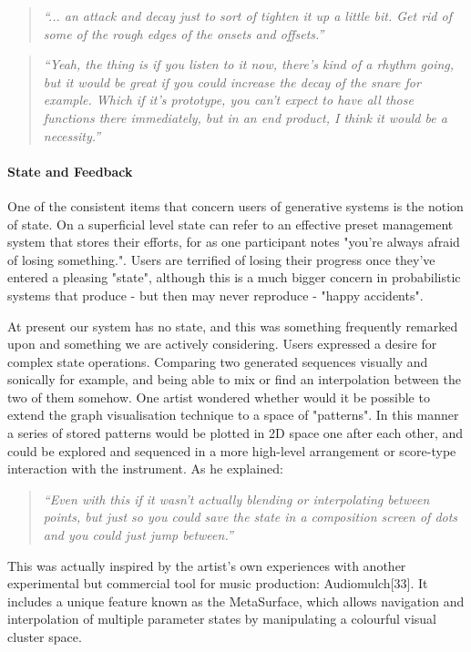 \blockquote{\textit{“... an attack and decay just to sort of tighten it up a little bit. Get rid of some of the rough edges of the onsets and offsets.”}}

\blockquote{\textit{“Yeah, the thing is if you listen to it now, there's kind of a rhythm going, but it would be great if you could increase the decay of the snare for example. Which if it's prototype, you can't expect to have all those functions there immediately, but in an end product, I think it would be a necessity.”}}

\paragraph{State and Feedback}

One of the consistent items that concern users of generative systems is the notion of state. On a superficial level state can refer to an effective preset management system that stores their efforts, for as one participant notes "you're always afraid of losing something.". Users are terrified of losing their progress once they've entered a pleasing "state", although this is a much bigger concern in probabilistic systems that produce - but then may never reproduce - "happy accidents".

At present our system has no state, and this was something frequently remarked upon and something we are actively considering. Users expressed a desire for complex state operations. Comparing two generated sequences visually and sonically for example, and being able to mix or find an interpolation between the two of them somehow. One artist wondered whether would it be possible to extend the graph visualisation technique to a space of "patterns". In this manner a series of stored patterns would be plotted in 2D space one after each other, and could be explored and sequenced in a more high-level arrangement or score-type interaction with the instrument. As he explained:

\blockquote{\textit{“Even with this if it wasn't actually blending or interpolating between points, but just so you could save the state in a composition screen of dots and you could just jump between.”}}

This was actually inspired by the artist's own experiences with another experimental but commercial tool for music production: Audiomulch[33]. It includes a unique feature known as the MetaSurface, which allows navigation and interpolation of multiple parameter states by manipulating a colourful visual cluster space.

